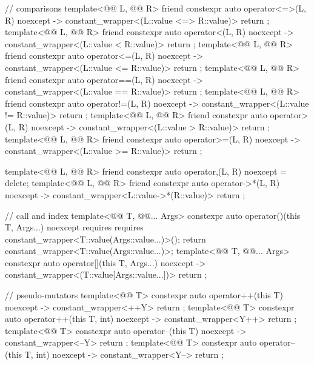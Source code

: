 \begin{codeblock}
{{    // comparisons
    template<@@ L, @@ R>
      friend constexpr auto operator<=>(L, R) noexcept
        -> constant_wrapper<(L::value <=> R::value)>
          { return {}; }
    template<@@ L, @@ R>
      friend constexpr auto operator<(L, R) noexcept -> constant_wrapper<(L::value < R::value)>
        { return {}; }
    template<@@ L, @@ R>
      friend constexpr auto operator<=(L, R) noexcept -> constant_wrapper<(L::value <= R::value)>
        { return {}; }
    template<@@ L, @@ R>
      friend constexpr auto operator==(L, R) noexcept -> constant_wrapper<(L::value == R::value)>
        { return {}; }
    template<@@ L, @@ R>
      friend constexpr auto operator!=(L, R) noexcept -> constant_wrapper<(L::value != R::value)>
        { return {}; }
    template<@@ L, @@ R>
      friend constexpr auto operator>(L, R) noexcept -> constant_wrapper<(L::value > R::value)>
        { return {}; }
    template<@@ L, @@ R>
      friend constexpr auto operator>=(L, R) noexcept -> constant_wrapper<(L::value >= R::value)>
        { return {}; }

    template<@@ L, @@ R>
      friend constexpr auto operator,(L, R) noexcept = delete;
    template<@@ L, @@ R>
      friend constexpr auto operator->*(L, R) noexcept -> constant_wrapper<L::value->*(R::value)>
        { return {}; }

    // call and index
    template<@@ T, @@... Args>
      constexpr auto operator()(this T, Args...) noexcept
        requires requires { constant_wrapper<T::value(Args::value...)>(); }
          { return constant_wrapper<T::value(Args::value...)>{}; }
    template<@@ T, @@... Args>
      constexpr auto operator[](this T, Args...) noexcept
        -> constant_wrapper<(T::value[Args::value...])>
          { return {}; }

    // pseudo-mutators
    template<@@ T>
      constexpr auto operator++(this T) noexcept
        -> constant_wrapper<++Y> { return {}; }
    template<@@ T>
      constexpr auto operator++(this T, int) noexcept
        -> constant_wrapper<Y++> { return {}; }
    template<@@ T>
      constexpr auto operator--(this T) noexcept
        -> constant_wrapper<--Y> { return {}; }
    template<@@ T>
      constexpr auto operator--(this T, int) noexcept
        -> constant_wrapper<Y--> { return {}; }

}}
\end{codeblock}
